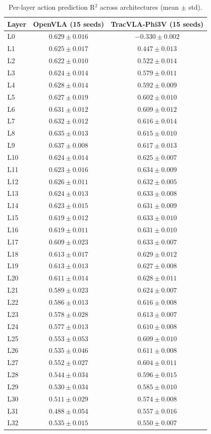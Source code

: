 \begin{table}[t]
\centering
\caption{Per-layer action prediction R$^2$ across architectures (mean $\pm$ std).}
\label{tab:cross_arch_r2}
\begin{tabular}{lcc}
\toprule
Layer & OpenVLA (15 seeds) & TracVLA-Phi3V (15 seeds) \\
\midrule
L0  & $0.629 \pm 0.016$ & $-0.330 \pm 0.002$ \\
L1  & $0.625 \pm 0.017$ & $0.447 \pm 0.013$ \\
L2  & $0.622 \pm 0.010$ & $0.522 \pm 0.014$ \\
L3  & $0.624 \pm 0.014$ & $0.579 \pm 0.011$ \\
L4  & $0.628 \pm 0.014$ & $0.592 \pm 0.009$ \\
L5  & $0.627 \pm 0.019$ & $0.602 \pm 0.010$ \\
L6  & $0.631 \pm 0.012$ & $0.609 \pm 0.012$ \\
L7  & $0.632 \pm 0.012$ & $0.616 \pm 0.014$ \\
L8  & $0.635 \pm 0.013$ & $0.615 \pm 0.010$ \\
L9  & $\mathbf{0.637 \pm 0.008}$ & $0.617 \pm 0.013$ \\
L10 & $0.624 \pm 0.014$ & $0.625 \pm 0.007$ \\
L11 & $0.623 \pm 0.016$ & $\mathbf{0.634 \pm 0.009}$ \\
L12 & $0.626 \pm 0.011$ & $0.632 \pm 0.005$ \\
L13 & $0.624 \pm 0.013$ & $0.633 \pm 0.008$ \\
L14 & $0.623 \pm 0.015$ & $0.631 \pm 0.009$ \\
L15 & $0.619 \pm 0.012$ & $0.633 \pm 0.010$ \\
L16 & $0.619 \pm 0.011$ & $0.631 \pm 0.010$ \\
L17 & $0.609 \pm 0.023$ & $0.633 \pm 0.007$ \\
L18 & $0.613 \pm 0.017$ & $0.629 \pm 0.012$ \\
L19 & $0.613 \pm 0.013$ & $0.627 \pm 0.008$ \\
L20 & $0.611 \pm 0.014$ & $0.628 \pm 0.011$ \\
L21 & $0.589 \pm 0.023$ & $0.624 \pm 0.007$ \\
L22 & $0.586 \pm 0.013$ & $0.616 \pm 0.008$ \\
L23 & $0.578 \pm 0.028$ & $0.613 \pm 0.007$ \\
L24 & $0.577 \pm 0.013$ & $0.610 \pm 0.008$ \\
L25 & $0.553 \pm 0.053$ & $0.609 \pm 0.010$ \\
L26 & $0.535 \pm 0.046$ & $0.611 \pm 0.008$ \\
L27 & $0.552 \pm 0.027$ & $0.604 \pm 0.011$ \\
L28 & $0.544 \pm 0.034$ & $0.596 \pm 0.015$ \\
L29 & $0.530 \pm 0.034$ & $0.585 \pm 0.010$ \\
L30 & $0.511 \pm 0.029$ & $0.574 \pm 0.008$ \\
L31 & $0.488 \pm 0.054$ & $0.557 \pm 0.016$ \\
L32 & $0.535 \pm 0.015$ & $0.550 \pm 0.007$ \\
\bottomrule
\end{tabular}
\end{table}
